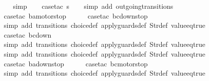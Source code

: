 \begin{isabellebody}
\ \ \isamarkupfalse%
\ simp\isanewline
\isanewline
\ \ \isamarkupfalse%
\ {\isacharparenleft}case{\isacharunderscore}tac\ {\isachardoublequoteopen}s{\isacharequal}{}{\isachardoublequoteclose}{\isacharparenright}\isanewline
\ \ \isamarkupfalse%
\ {\isacharparenleft}simp\ add{\isacharcolon}\ outgoing{\isacharunderscore}transitions{\isacharunderscore}{}{\isacharparenright}\isanewline
\ \isamarkupfalse%
\ {\isacharparenleft}case{\isacharunderscore}tac\ {\isachardoublequoteopen}ba{\isacharequal}motorstop{}{\isachardoublequoteclose}{\isacharparenright}\isanewline
\ \ \ \ \isamarkupfalse%
\ {\isacharparenleft}case{\isacharunderscore}tac\ {\isachardoublequoteopen}bc{\isacharequal}down{}{}stop{\isachardoublequoteclose}{\isacharparenright}\isanewline
\ \ \ \ \ \isamarkupfalse%
\ {\isacharparenleft}simp\ add{\isacharcolon}\ transitions\ choice{\isacharunderscore}def\ apply{\isacharunderscore}guards{\isacharunderscore}def\ Str{\isacharunderscore}def\ value{\isacharunderscore}eq{\isacharunderscore}true{\isacharparenright}\isanewline
\ \ \ \ \isamarkupfalse%
\ {\isacharparenleft}case{\isacharunderscore}tac\ {\isachardoublequoteopen}bc{\isacharequal}down{}{}{\isachardoublequoteclose}{\isacharparenright}\isanewline
\ \ \ \ \ \isamarkupfalse%
\ {\isacharparenleft}simp\ add{\isacharcolon}\ transitions\ choice{\isacharunderscore}def\ apply{\isacharunderscore}guards{\isacharunderscore}def\ Str{\isacharunderscore}def\ value{\isacharunderscore}eq{\isacharunderscore}true{\isacharparenright}\isanewline
\ \ \ \ \isamarkupfalse%
\ {\isacharparenleft}simp\ add{\isacharcolon}\ transitions\ choice{\isacharunderscore}def\ apply{\isacharunderscore}guards{\isacharunderscore}def\ Str{\isacharunderscore}def\ value{\isacharunderscore}eq{\isacharunderscore}true{\isacharparenright}\isanewline
\ \isamarkupfalse%
\ {\isacharparenleft}case{\isacharunderscore}tac\ {\isachardoublequoteopen}ba{\isacharequal}down{}{}stop{\isachardoublequoteclose}{\isacharparenright}\isanewline
\ \ \ \ \isamarkupfalse%
\ {\isacharparenleft}case{\isacharunderscore}tac\ {\isachardoublequoteopen}bc{\isacharequal}motorstop{}{\isachardoublequoteclose}{\isacharparenright}\isanewline
\ \ \ \ \ \isamarkupfalse%
\ {\isacharparenleft}simp\ add{\isacharcolon}\ transitions\ choice{\isacharunderscore}def\ apply{\isacharunderscore}guards{\isacharunderscore}def\ Str{\isacharunderscore}def\ value{\isacharunderscore}eq{\isacharunderscore}true{\isacharparenright}\isanewline

\end{isabellebody}
